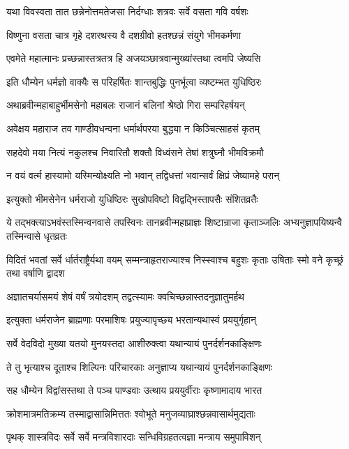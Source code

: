 \twolineshloka
{यथा विवस्वता तात छन्नेनोत्तमतेजसा}
{निर्दग्धाः शत्रवः सर्वे वसता गवि वर्षशः}


\twolineshloka
{विष्णुना वसता चात्र गृहे दशरथस्य वै}
{दशग्रीवो हतश्छन्नं संयुगे भीमकर्मणा}


\twolineshloka
{एवमेते महात्मानः प्रच्छन्नास्तत्रतत्र हि}
{अजयञ्छात्रवान्मुख्यांस्तथा त्वमपि जेष्यसि}



\twolineshloka
{इति धौम्येन धर्मज्ञो वाक्यैः स परिहर्षितः}
{शान्तबुद्धिः पुनर्भूत्वा व्यष्टम्भत युधिष्ठिरः}


\twolineshloka
{अथाब्रवीन्महाबाहुर्भीमसेनो महाबलः}
{राजानं बलिनां श्रेष्ठो गिरा सम्परिहर्षयन्}


\twolineshloka
{अवेक्षय महाराज तव गाण्डीवधन्वना}
{धर्मार्थपरया बुद्ध्या न किञ्चित्साहसं कृतम्}


\twolineshloka
{सहदेवो मया नित्यं नकुलश्च निवारितौ}
{शक्तौ विध्वंसने तेषां शत्रुघ्नौ भीमविक्रमौ}


\twolineshloka
{न वयं वर्त्म हास्यामो यस्मिन्योक्ष्यति नो भवान्}
{तद्विधत्तां भवान्सर्वं क्षिप्रं जेष्यामहे परान्}


\twolineshloka
{इत्युक्तो भीमसेनेन धर्मराजो युधिष्ठिरः}
{सुखोपविष्टो विद्वद्भिस्तापसैः संशितव्रतैः}


\threelineshloka
{ये तद्भक्त्याऽभवंस्तस्मिन्वनवासे तपस्विनः}
{तानब्रवीन्महाप्राज्ञः शिष्टान्राजा कृताञ्जलिः}
{अभ्यनुज्ञापयिष्यन्वै तस्मिन्वासे धृतव्रतः}


\threelineshloka
{विदितं भवतां सर्वे र्धार्तराष्ट्रैर्यथा वयम्}
{सम्मन्त्राहृतराज्याश्च निस्स्वाश्च बहुशः कृताः}
{उषिताः स्मो वने कृच्छ्रं तथा वर्षाणि द्वादश}


\twolineshloka
{अज्ञातचर्यासमयं शेषं वर्षं त्रयोदशम्}
{तद्वत्स्यामः क्वचिच्छन्नास्तदनुज्ञातुमर्हथ}


\twolineshloka
{इत्युक्ता धर्मराजेन ब्राह्मणाः परमाशिषः}
{प्रयुज्यापृच्छ्य भरतान्यथास्वं प्रययुर्गृहान्}


\twolineshloka
{सर्वे वेदविदो मुख्या यतयो मुनयस्तदा}
{आशीरुक्त्वा यथान्यायं पुनर्दर्शनकाङ्क्षिणः}


\twolineshloka
{ते तु भृत्याश्च दूताश्च शिल्पिनः परिचारकाः}
{अनुज्ञाप्य यथान्यायं पुनर्दर्शनकाङ्क्षिणः}


\twolineshloka
{सह धौम्येन विद्वांसस्तथा ते पञ्च पाण्डवाः}
{उत्थाय प्रययुर्वीराः कृष्णामादाय भारत}


\twolineshloka
{क्रोशमात्रमतिक्रम्य तस्माद्वासान्निमित्ततः}
{श्वोभूते मनुजव्याघ्राश्छन्नवासार्थमुद्यताः}


\twolineshloka
{पृथक् शास्त्रविदः सर्वे सर्वे मन्त्रविशारदाः}
{सन्धिविग्रहतत्वज्ञा मन्त्राय समुपाविशन्}

